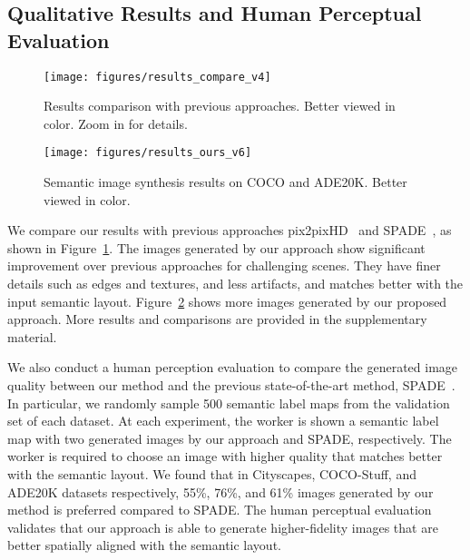 \documentclass{article}
\begin{document}
\subsection{Qualitative Results and Human Perceptual Evaluation}
\begin{figure}[t]
\centering
\texttt{[image: figures/results\_compare\_v4]}
\caption{Results comparison with previous approaches. Better viewed in color. Zoom in for details.}
\label{fig:result_compare}
\end{figure}

\begin{figure}[t]
\centering
\texttt{[image: figures/results\_ours\_v6]}
\caption{Semantic image synthesis results on COCO and ADE20K. Better viewed in color.}
\label{fig:result_ours}
\end{figure}
We compare our results with previous approaches pix2pixHD~\cite{wang2018high} and SPADE~\cite{park2019semantic}, as shown in Figure~\ref{fig:result_compare}.
The images generated by our approach show significant improvement over previous approaches for challenging scenes. 
They have finer details such as edges and textures, and less artifacts, and matches better with the input semantic layout. 
Figure~\ref{fig:result_ours} shows more images generated by our proposed approach. More results and comparisons are provided in the supplementary material.

We also conduct a human perception evaluation to compare the generated image quality between our method and the previous state-of-the-art method, SPADE~\cite{park2019semantic}.
In particular, we randomly sample 500 semantic label maps from the validation set of each dataset.
At each experiment, the worker is shown a semantic label map with two generated images by our approach and SPADE, respectively.
The worker is required to choose an image with higher quality that matches better with the semantic layout.
We found that in Cityscapes, COCO-Stuff, and ADE20K datasets respectively, 55\%, 76\%, and 61\% images generated by our method is preferred compared to SPADE.
The human perceptual evaluation validates that our approach is able to generate higher-fidelity images that are better spatially aligned with the semantic layout.
\end{document}
